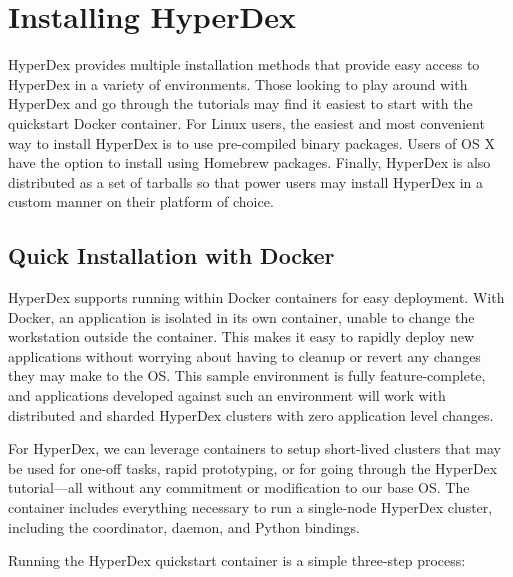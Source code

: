 \chapter{Installing HyperDex}
\label{chap:installation}

HyperDex provides multiple installation methods that provide easy access to
HyperDex in a variety of environments.  Those looking to play around with
HyperDex and go through the tutorials may find it easiest to start with the
quickstart Docker container.  For Linux users, the easiest and most convenient
way to install HyperDex is to use pre-compiled binary packages.  Users of OS X
have the option to install using Homebrew packages.  Finally, HyperDex is also
distributed as a set of tarballs so that power users may install HyperDex in a
custom manner on their platform of choice.

\section{Quick Installation with Docker}

HyperDex supports running within Docker containers for easy deployment.  With
Docker, an application is isolated in its own container, unable to change the
workstation outside the container.  This makes it easy to rapidly deploy new
applications without worrying about having to cleanup or revert any changes they
may make to the OS.  This sample environment is fully feature-complete, and
applications developed against such an environment will work with distributed
and sharded HyperDex clusters with zero application level changes.

For HyperDex, we can leverage containers to setup short-lived clusters that may
be used for one-off tasks, rapid prototyping, or for going through the HyperDex
tutorial---all without any commitment or modification to our base OS.  The
 container includes everything necessary to run a
single-node HyperDex cluster, including the coordinator, daemon, and Python
bindings.

Running the HyperDex quickstart container is a simple three-step process:

